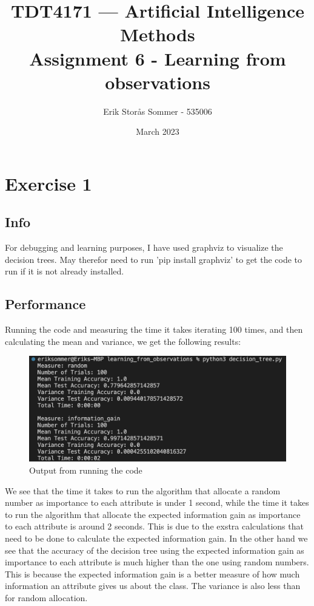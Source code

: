\documentclass{article}
\title{TDT4171 — Artificial Intelligence Methods \\ Assignment 6 - Learning from observations}
\author{Erik Storås Sommer - 535006}
\date{March 2023}
\begin{document}
\maketitle
\setlength{\parindent}{0pt}

\section*{Exercise 1}

\subsection*{Info}

For debugging and learning purposes, I have used graphviz to visualize the decision trees.
May therefor need to run 'pip install graphviz' to get the code to run if it is not already installed.

\subsection*{Performance}

Running the code and measuring the time it takes iterating 100 times, and then calculating the mean and variance, we get the following results:

\begin{figure}[h]
    \includegraphics[width=\linewidth]{output.png}
    \caption{Output from running the code}
    \label{fig:image1}
\end{figure}

We see that the time it takes to run the algorithm that allocate a random number as importance to each attribute is under 1 second, while the time it takes to run the algorithm that allocate the expected information gain as importance to each attribute is around 2 seconds.
This is due to the exstra calculations that need to be done to calculate the expected information gain.
In the other hand we see that the accuracy of the decision tree using the expected information gain as importance to each attribute is much higher than the one using random numbers.
This is because the expected information gain is a better measure of how much information an attribute gives us about the class. The variance is also less than for random allocation.
\end{document}
